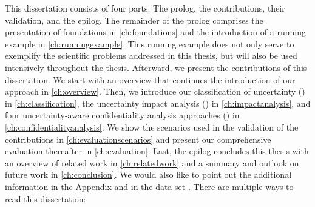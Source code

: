 This dissertation consists of four parts: The prolog, the contributions, their validation, and the epilog.
The remainder of the prolog comprises the presentation of foundations in \autoref{ch:foundations} and the introduction of a running example in \autoref{ch:runningexample}.
This running example does not only serve to exemplify the scientific problems addressed in this thesis, but will also be used intensively throughout the thesis.
Afterward, we present the contributions of this dissertation.
We start with an overview that continues the introduction of our approach in \autoref{ch:overview}.
Then, we introduce our classification of uncertainty () in \autoref{ch:classification}, the uncertainty impact analysis () in \autoref{ch:impactanalysis}, and four uncertainty-aware confidentiality analysis approaches () in \autoref{ch:confidentialityanalysis}.
We show the scenarios used in the validation of the contributions in \autoref{ch:evaluationscenarios} and present our comprehensive evaluation thereafter in \autoref{ch:evaluation}.
Last, the epilog concludes this thesis with an overview of related work in \autoref{ch:relatedwork} and a summary and outlook on future work in \autoref{ch:conclusion}.
We would also like to point out the additional information in the \hyperref[ch:appendix]{Appendix} and in the data set \cite{dataset}.
There are multiple ways to read this dissertation:

